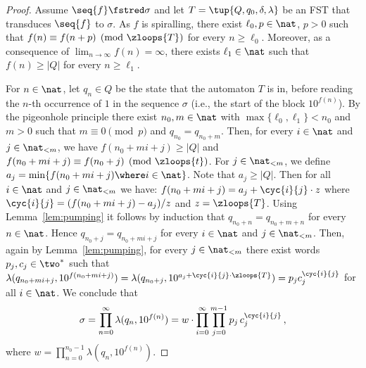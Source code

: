 \begin{proof}
  Assume $\seq{f} \fstred \sigma$ and let $T = \tup{Q,q_0,\delta,\lambda}$ be an FST
  that transduces $\seq{f}$ to $\sigma$.
As $f$ is spiralling, 
  there exist $\ell_0, p \in \nat$, $p > 0$ such that 
  $f(n) \equiv f(n+p) \pmod{\zloops{T}}$ for every $n \ge \ell_0$.
  Moreover, as a consequence of $\lim_{n \to \infty} f(n) = \infty$, there exists $\ell_1 \in \nat$ such that 
  $f(n) \ge |Q|$ for every $n \ge \ell_1$.

  For $n \in \nat$, let $q_n \in Q$ be the state that the automaton $T$ is in, before 
  reading the $n$-th occurrence of $1$ in the sequence $\sigma$
  (i.e., the start of the block $1 0^{f(n)}$). 
By the pigeonhole principle there exist $n_0,m \in \nat$
  with $\max \{\ell_0,\ell_1\} < n_0$ and $m > 0$
  such that $m \equiv 0 \pmod{p}$ and $q_{n_0} = q_{n_0+m}$.
Then, for every $i \in \nat$ and $j \in \nat_{<m}$, we have 
  $f(n_0 + mi + j) \ge |Q|$ and 
  $f(n_0 + mi + j) \equiv f(n_0 + j) \pmod{\zloops{t}}$.
  For $j \in \nat_{<m}$, 
  we define $a_j = \min \{f(n_0 + mi + j) \where i \in \nat\}$.
  Note that $a_j \ge |Q|$.
  Then for all $i \in \nat$ and $j \in \nat_{<m}$ we have: 
  $f(n_0 + mi + j) = a_j + \cyc{i}{j} \cdot z$
  where $\cyc{i}{j} = (f(n_0 + mi + j)-a_j) / z$ and $z = \zloops{T}$.
Using Lemma~\ref{lem:pumping} it follows by induction that
  $q_{n_0+n} = q_{n_0+m+n}$ for every $n \in \nat$.
  Hence
  $q_{n_0+j} = q_{n_0+mi+j}$ for every $i \in \nat$ and $j \in \nat_{<m}$.
  Then, again by Lemma~\ref{lem:pumping}, for every $j \in \nat_{<m}$
  there exist words~$p_j,c_j \in \two^*$
  such that 
  $\lambda(q_{n_0+mi+j}, 1 0^{f(n_0 + mi + j)}) 
    = \lambda(q_{n_0+j}, 1 0^{a_j + \cyc{i}{j} \cdot \zloops{T}}) 
    = p_j c_j^{\cyc{i}{j}}$
  for all $i \in \nat$.
  We conclude that 
  \begin{align*}
    \sigma 
    = \prod_{n = 0}^{\infty} \lambda(q_n,10^{f(n)}) 
    = w \cdot \prod_{i = 0}^{\infty} \prod_{j = 0}^{m-1} p_j \, c_j^{\cyc{i}{j}}\,,
  \end{align*}
  where $w = \prod_{n = 0}^{n_0-1} \lambda(q_n,10^{f(n)})$.


\end{proof}
